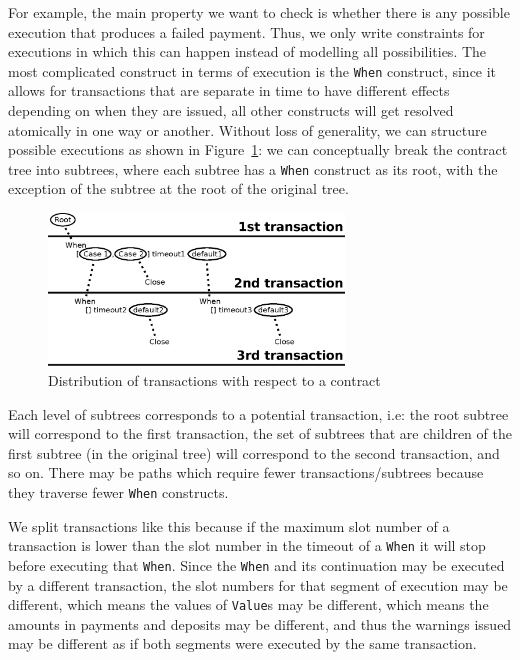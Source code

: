 \documentclass[english,runningheads]{llncs}
\begin{document}
For example, the main property we want to check is whether there is
any possible execution that produces a failed payment. Thus, we only
write constraints for executions in which this can happen instead of
modelling all possibilities.
The most complicated construct in terms of execution is the \texttt{When}
construct, since it allows for transactions that are separate in time
to have different effects depending on when they are issued, all other
constructs will get resolved atomically in one way or another. Without
loss of generality, we can structure possible executions as shown in
Figure~\ref{fig:Distribution-of-transactions}: we can conceptually break
the contract tree into subtrees, where each subtree has a \texttt{When}
construct as its root, with the exception of the subtree at the root
of the original tree.

\begin{figure}
\center
\includegraphics[width=0.7\textwidth]{figures/transactions}

\caption{Distribution of transactions with respect to a contract\label{fig:Distribution-of-transactions}}

\end{figure}

Each level of subtrees corresponds to a potential transaction, i.e: the
root subtree will correspond to the first transaction, the set of
subtrees that are children of the first subtree (in the original tree)
will correspond to the second transaction, and so on. There may be
paths which require fewer transactions/subtrees because they traverse
fewer \texttt{When} constructs.

We split transactions like this because if the maximum slot number of
a transaction is lower than the slot number in the timeout of a \texttt{When}
it will stop before executing that \texttt{When}. Since the \texttt{When}
and its continuation may be executed by a different transaction, the
slot numbers for that segment of execution may be different, which means
the values of \texttt{Value}s may be different, which means the amounts
in payments and deposits may be different, and thus the warnings issued may
be different as if both segments were executed by the same transaction.
\end{document}
